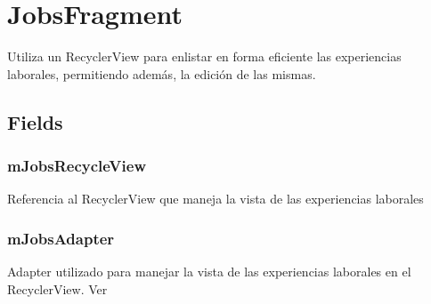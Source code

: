 \documentclass[letterpaper,10pt,english]{sphinxmanual}
\begin{document}
\section{JobsFragment}
\label{Fragments/JobsFragment:jobsfragment}\label{Fragments/JobsFragment::doc}

\begin{fulllineitems}
\label{Fragments/JobsFragment:com.fiuba.tallerii.jobify.JobsFragment}
Utiliza un RecyclerView para enlistar en forma eficiente las experiencias laborales, permitiendo además, la edición de las mismas.

\end{fulllineitems}



\subsection{Fields}
\label{Fragments/JobsFragment:fields}

\subsubsection{mJobsRecycleView}
\label{Fragments/JobsFragment:mjobsrecycleview}

\begin{fulllineitems}
\label{Fragments/JobsFragment:com.fiuba.tallerii.jobify.JobsFragment.mJobsRecycleView}
Referencia al RecyclerView que maneja la vista de las experiencias laborales

\end{fulllineitems}



\subsubsection{mJobsAdapter}
\label{Fragments/JobsFragment:mjobsadapter}

\begin{fulllineitems}
\label{Fragments/JobsFragment:com.fiuba.tallerii.jobify.JobsFragment.mJobsAdapter}
Adapter utilizado para manejar la vista de las experiencias laborales en el RecyclerView. Ver 

\end{fulllineitems}
\end{document}
